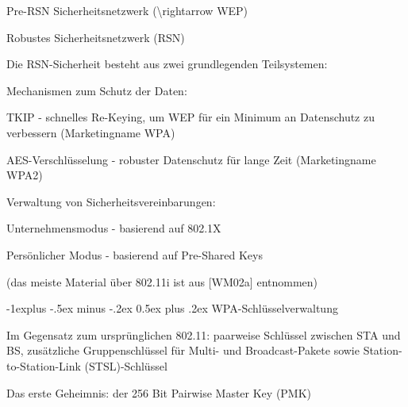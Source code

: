 \documentclass[a4paper]{article}
\makeatletter
\renewcommand{\subsection}{\@startsection{subsection}{2}{0mm}%
 {-1explus -.5ex minus -.2ex}%
 {0.5ex plus .2ex}%
 {\normalfont\normalsize\bfseries}}
\makeatother
\begin{document}
\begin{multicols}{3}
\begin{itemize*}
            \begin{itemize*}
                  \item Pre-RSN Sicherheitsnetzwerk (\textbackslash rightarrow WEP)
                  \item Robustes Sicherheitsnetzwerk (RSN)
            \end{itemize*}
            \item
            Die RSN-Sicherheit besteht aus zwei grundlegenden Teilsystemen:

            \begin{itemize*}
                  \item Mechanismen zum Schutz der Daten:
                  \begin{itemize*} \item TKIP - schnelles Re-Keying, um WEP für ein Minimum an Datenschutz zu verbessern (Marketingname WPA) \item AES-Verschlüsselung - robuster Datenschutz für lange Zeit (Marketingname WPA2) \end{itemize*}
            \end{itemize*}
            \item
            Verwaltung von Sicherheitsvereinbarungen:

            \begin{itemize*}
                  \item Unternehmensmodus - basierend auf 802.1X
                  \item Persönlicher Modus - basierend auf Pre-Shared Keys
            \end{itemize*}
      \end{itemize*}

      (das meiste Material über 802.11i ist aus {[}WM02a{]} entnommen)


      \subsection{WPA-Schlüsselverwaltung}

      \begin{itemize*}
            \item
            Im Gegensatz zum ursprünglichen 802.11: paarweise Schlüssel zwischen
            STA und BS, zusätzliche Gruppenschlüssel für Multi- und
            Broadcast-Pakete sowie Station-to-Station-Link (STSL)-Schlüssel
            \item
            Das erste Geheimnis: der 256 Bit Pairwise Master Key (PMK)


\end{itemize*}
\end{multicols}
\end{document}
